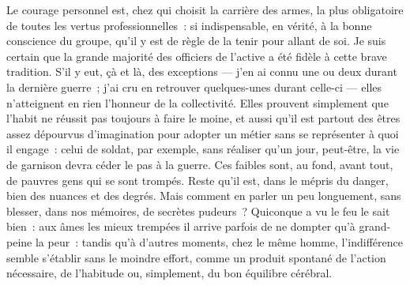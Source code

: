 \documentclass[french,twoside]{book} %
\begin{document}
\noindent Le courage personnel est, chez qui choisit la carrière des armes, la plus obligatoire de toutes les vertus professionnelles : si indispensable, en vérité, à la bonne conscience du groupe, qu’il y est de règle de la tenir pour allant de soi. Je suis certain que la grande majorité des officiers de l’active a été fidèle à cette brave tradition. S’il y eut, çà et là, des exceptions — j’en ai connu une ou deux durant la dernière guerre ; j’ai cru en retrouver quelques-unes durant celle-ci — elles n’atteignent en rien l’honneur de la collectivité. Elles prouvent simplement que l’habit ne réussit pas toujours à faire le moine, et aussi qu’il est partout des êtres assez dépourvus d’imagination pour adopter un métier sans se représenter à quoi il engage : celui de soldat, par exemple, sans réaliser qu’un jour, peut-être, la vie de garnison devra céder le pas à la guerre. Ces faibles sont, au fond, avant tout, de pauvres gens qui se sont trompés. Reste qu’il est, dans le mépris du danger, bien des nuances et des degrés. Mais comment en parler un peu longuement, sans blesser, dans nos mémoires, de secrètes pudeurs ? Quiconque a vu le feu le sait bien : aux âmes les mieux trempées il arrive parfois de ne dompter qu’à grand-peine la peur : tandis qu’à   d’autres moments, chez le même homme, l’indifférence semble s’établir sans le moindre effort, comme un produit spontané de l’action nécessaire, de l’habitude ou, simplement, du bon équilibre cérébral.\par
\end{document}
